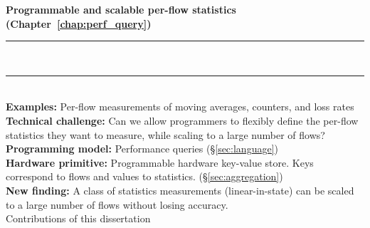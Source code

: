 \begin{table}
\textbf{Programmable and scalable per-flow statistics (Chapter~\ref{chap:perf_query})}
\\[-7pt]\rule{\textwidth}{1pt}\\[-7pt]\rule{\textwidth}{1pt} \\
\textbf{Examples:} Per-flow measurements of moving averages, counters, and loss rates \\
\textbf{Technical challenge:} Can we allow programmers to flexibly define the per-flow
statistics they want to measure, while scaling to a large number of flows?\\
\textbf{Programming model:} Performance queries (\S\ref{sec:language}) \\
\textbf{Hardware primitive:} Programmable hardware key-value store. Keys correspond to
flows and values to statistics. (\S\ref{sec:aggregation}) \\
\textbf{New finding:} A class of statistics measurements (linear-in-state) can be scaled
to a large number of flows without losing accuracy.\\
\caption{Contributions of this dissertation}
\label{tab:contributions}
\end{table}

